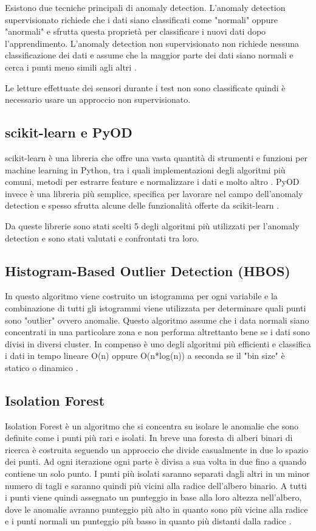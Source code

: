 Esistono due tecniche principali di anomaly detection. L'anomaly detection supervisionato richiede che i dati siano classificati come "normali" oppure "anormali" e sfrutta questa proprietà per classificare i nuovi dati dopo l'apprendimento. L'anomaly detection non supervisionato non richiede nessuna classificazione dei dati e assume che la maggior parte dei dati siano normali e cerca i punti  meno simili agli altri \cite{AnomalyDetection}.

Le letture effettuate dei sensori durante i test non sono classificate quindi è necessario usare un approccio non supervisionato. 

\subsection{scikit-learn e PyOD}
scikit-learn è una libreria che offre una vasta quantità di strumenti e funzioni per machine learning in Python, tra i quali implementazioni degli algoritmi più comuni, metodi per estrarre feature e normalizzare i dati e molto altro \cite{scikit-learn}.
PyOD invece è una libreria più semplice, specifica per lavorare nel campo dell'anomaly detection e spesso sfrutta alcune delle funzionalità offerte da scikit-learn \cite{zhao2019pyod}.

Da queste librerie sono stati scelti 5 degli algoritmi più utilizzati per l'anomaly detection e sono stati valutati e confrontati tra loro.

\subsection{Histogram-Based Outlier Detection (HBOS)}
In questo algoritmo viene costruito un istogramma per ogni variabile e la combinazione di tutti gli istogrammi viene utilizzata per determinare quali punti sono "outlier" ovvero anomalie. Questo algoritmo assume che i data normali siano concentrati in una particolare zona e non performa altrettanto bene se i dati sono divisi in diversi cluster. In compenso è uno degli algoritmi più efficienti e classifica i dati in tempo lineare O(n) oppure O(n*log(n)) a seconda se il "bin size" è statico o dinamico \cite{HBOS}.

\subsection{Isolation Forest}
Isolation Forest è un algoritmo che si concentra su isolare le anomalie che sono definite come i punti più rari e isolati. In breve una foresta di alberi binari di ricerca è costruita seguendo un approccio che divide casualmente in due lo spazio dei punti. Ad ogni iterazione ogni parte è divisa a sua volta in due fino a quando contiene un solo punto. I punti più isolati saranno separati dagli altri in un minor numero di tagli e saranno quindi più vicini alla radice dell'albero binario. A tutti i punti viene quindi assegnato un punteggio in base alla loro altezza nell'albero, dove le anomalie avranno punteggio più alto in quanto sono più vicine alla radice e i punti normali un punteggio più basso in quanto più distanti dalla radice \cite{IF}.


